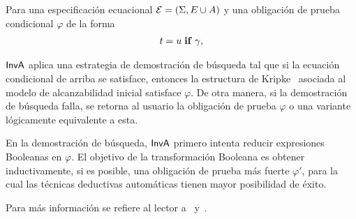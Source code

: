 Para una especificación ecuacional $\mathcal{E} = (\Sigma, E \cup A) $
y una obligación de prueba condicional $\varphi$ de la forma
\begin{align*}
  t = u \; \mathbf{if}\; \gamma,
\end{align*}

\noindent ${\sf InvA}$ aplica una estrategia de demostración de búsqueda tal
que si la ecuación condicional de arriba se satisface, entonces la
estructura de Kripke~\cite{clarke-book} asociada al modelo de
alcanzabilidad inicial satisface $\varphi$. De otra manera, si la
demostración de búsqueda falla, se retorna al usuario la obligación de
prueba $\varphi$ o una variante lógicamente equivalente a esta.

En la demostración de búsqueda, ${\sf InvA}$ primero intenta reducir expresiones Booleanas en $\varphi$. El objetivo de la transformación
Booleana es obtener inductivamente, si es posible, una obligación de
prueba más fuerte $\varphi'$, para la cual las técnicas deductivas
automáticas tienen mayor posibilidad de éxito.

Para más información se refiere al lector a~\cite{thesis-rocha}
y~\cite{springerlink:10.1007/978-3-642-22944-2_22}.

